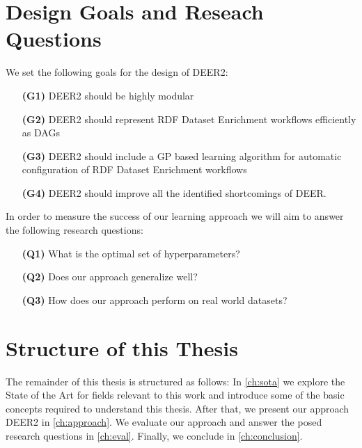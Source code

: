 \section{Design Goals and Reseach Questions}
\label{sec:goals}
We set the following goals for the design of \ac{DEER2}:

\begin{itemize}
  \item[\textbf{(G1)}] \ac{DEER2} should be highly modular
  \item[\textbf{(G2)}] \ac{DEER2} should represent \ac{RDF} Dataset Enrichment workflows efficiently as \acp{DAG}
  \item[\textbf{(G3)}] \ac{DEER2} should include a \ac{GP} based learning algorithm for automatic configuration of \ac{RDF} Dataset Enrichment workflows
  \item[\textbf{(G4)}] \ac{DEER2} should improve all the identified shortcomings of \ac{DEER}.
\end{itemize}

\noindent
In order to measure the success of our learning approach we will aim to answer the following research questions:

\begin{itemize}
  \item[\textbf{(Q1)}] What is the optimal set of hyperparameters?
  \item[\textbf{(Q2)}] Does our approach generalize well?
  \item[\textbf{(Q3)}] How does our approach perform on real world datasets?
\end{itemize}

\section{Structure of this Thesis}
\label{sec:structure}
The remainder of this thesis is structured as follows:
In \autoref{ch:sota} we explore the State of the Art for fields relevant to this work and introduce some of the basic concepts required to understand this thesis.
After that, we present our approach \ac{DEER2} in \autoref{ch:approach}.
We evaluate our approach and answer the posed research questions in \autoref{ch:eval}.
Finally, we conclude in \autoref{ch:conclusion}.






